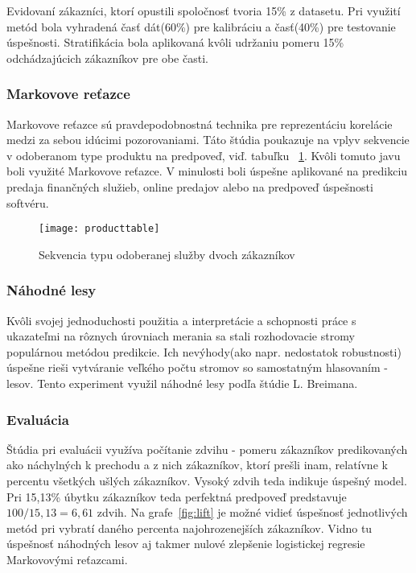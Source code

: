 Evidovaní zákazníci, ktorí opustili spoločnosť tvoria 15\% z datasetu. Pri využití metód bola vyhradená časť dát(60\%) pre kalibráciu a časť(40\%) pre testovanie úspešnosti. Stratifikácia bola aplikovaná kvôli udržaniu pomeru 15\% odchádzajúcich zákazníkov pre obe časti. %

\subsubsection{Markovove reťazce}
\label{markov_markov}

Markovove reťazce sú pravdepodobnostná technika pre reprezentáciu korelácie medzi za sebou idúcimi pozorovaniami. Táto štúdia poukazuje na vplyv sekvencie v odoberanom type produktu na predpoveď, viď. tabuľku ~\ref{fig:producttable}. Kvôli tomuto javu boli využité Markovove reťazce. V minulosti boli úspešne aplikované na predikciu predaja finančných služieb, online predajov alebo na predpoveď úspešnosti softvéru.
\begin{figure}[H]
\begin{center}
\texttt{[image: producttable]}\end{center}
\caption[producttable]{Sekvencia typu odoberanej služby dvoch zákazníkov}\label{fig:producttable}
\end{figure}

\subsubsection{Náhodné lesy}
\label{markov_lesy}

Kvôli svojej jednoduchosti použitia a interpretácie a schopnosti práce s ukazateľmi na rôznych úrovniach merania sa stali rozhodovacie stromy populárnou metódou predikcie. Ich nevýhody(ako napr. nedostatok robustnosti) úspešne rieši vytváranie veľkého počtu stromov so samostatným hlasovaním - lesov. Tento experiment využil náhodné lesy podľa štúdie L. Breimana. %

\subsubsection{Evaluácia}
\label{markov_evaluacia}

Štúdia pri evaluácii využíva počítanie zdvihu - pomeru zákazníkov predikovaných ako náchylných k prechodu a z nich zákazníkov, ktorí prešli inam, relatívne k percentu všetkých ušlých zákazníkov. Vysoký zdvih teda indikuje úspešný model. Pri 15,13\% úbytku zákazníkov teda perfektná predpoveď predstavuje $100/15,13 = 6,61$ zdvih. Na grafe~\ref{fig:lift} je možné vidieť úspešnosť jednotlivých metód pri vybratí daného percenta najohrozenejších zákazníkov. Vidno tu úspešnosť náhodných lesov aj takmer nulové zlepšenie logistickej regresie Markovovými reťazcami.

